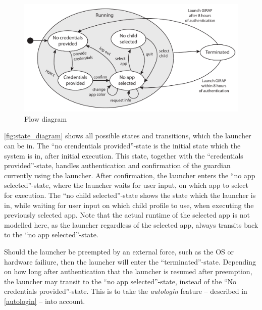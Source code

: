 \begin{figure}[h]
	\centering
	\includegraphics[width=1\textwidth]{gfx/statediagram.pdf}
	\caption{Flow diagram}
	\label{fig:flow_diagram}
\end{figure}

\autoref{fig:state_diagram} shows all possible states and transitions, which the launcher can be in. The “no crendentials provided”-state is the initial state which the system is in, after initial execution.
This state, together with the “credentials provided”-state, handles authentication and confirmation of the guardian currently using the launcher.
After confirmation, the launcher enters the “no app selected”-state, where the launcher waits for user input, on which app to select for execution.
The “no child selected”-state shows the state which the launcher is in, while waiting for user input on which child profile to use, when executing the previously selected app.
Note that the actual runtime of the selected app is not modelled here, as the launcher regardless of the selected app, always transits back to the “no app selected”-state.

Should the launcher be preempted by an external force, such as the OS or hardware failiure, then the launcher will enter the “terminated”-state.
Depending on how long after authentication that the launcher is resumed after preemption, the launcher may transit to the “no app selected”-state, instead of the “No credentials provided”-state.
This is to take the \emph{autologin} feature -- described in \autoref{autologin} -- into account.
